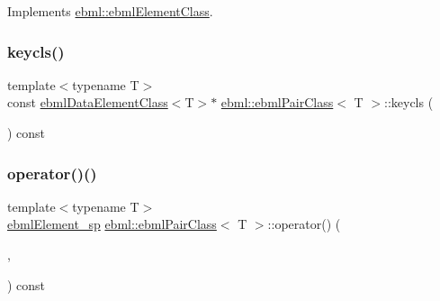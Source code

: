 Implements \mbox{\hyperlink{classebml_1_1ebmlElementClass_a223ede6b8bc3c85251d2d73f0256fb45}{ebml\+::ebml\+Element\+Class}}.

\mbox{\label{classebml_1_1ebmlPairClass_a94538c4319b9d572bce2c05f6d999410}} 
\subsubsection{\texorpdfstring{keycls()}{keycls()}}
{\footnotesize\ttfamily template$<$typename T$>$ \\
const \mbox{\hyperlink{classebml_1_1ebmlDataElementClass}{ebml\+Data\+Element\+Class}}$<$T$>$$\ast$ \mbox{\hyperlink{classebml_1_1ebmlPairClass}{ebml\+::ebml\+Pair\+Class}}$<$ T $>$\+::keycls (\begin{DoxyParamCaption}{ }\end{DoxyParamCaption}) const}

\mbox{\label{classebml_1_1ebmlPairClass_a7f292456eaed4b0cebfbdd1c7f137444}} 
\subsubsection{\texorpdfstring{operator()()}{operator()()}\hspace{0.1cm}{\footnotesize\ttfamily [1/5]}}
{\footnotesize\ttfamily template$<$typename T$>$ \\
\mbox{\hyperlink{namespaceebml_adad533b7705a16bb360fe56380c5e7be}{ebml\+Element\+\_\+sp}} \mbox{\hyperlink{classebml_1_1ebmlPairClass}{ebml\+::ebml\+Pair\+Class}}$<$ T $>$\+::operator() (\begin{DoxyParamCaption}\item[{const \mbox{\hyperlink{namespaceebml_adad533b7705a16bb360fe56380c5e7be}{ebml\+Element\+\_\+sp}} \&}]{,  }\item[{const \mbox{\hyperlink{namespaceebml_adad533b7705a16bb360fe56380c5e7be}{ebml\+Element\+\_\+sp}} \&}]{ }\end{DoxyParamCaption}) const}

\mbox{\label{classebml_1_1ebmlPairClass_abe0424fbc5ad585ed11693f9d9f71f9e}} 
